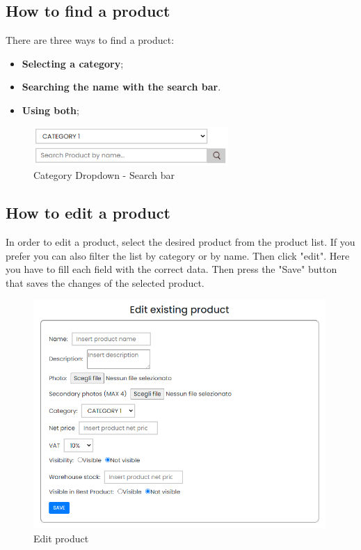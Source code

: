 \subsection{How to find a product}\label{_findProduct}
There are three ways to find a product:
\begin{itemize} 
    \item \textbf{Selecting a category};
    \item \textbf{Searching the name with the search bar}. 
    \item \textbf{Using both};
\end{itemize}

\begin{figure}[H]
    \centering
    \includegraphics[width=20em]{res/images/venditore/categoryandsearchbar.png}
    \caption{Category Dropdown - Search bar}
\end{figure}

\subsection{How to edit a product}\label{_editProduct}
In order to edit a product, select the desired product from the product list. If you prefer you can also filter the list by category or by name. Then click "edit".
Here you have to fill each field with the correct data. Then press the "Save" button that saves the changes of the selected product.
\begin{figure}[H]
    \centering
    \includegraphics[width=30em]{res/images/venditore/editproduct.png}
    \caption{Edit product}
\end{figure}

